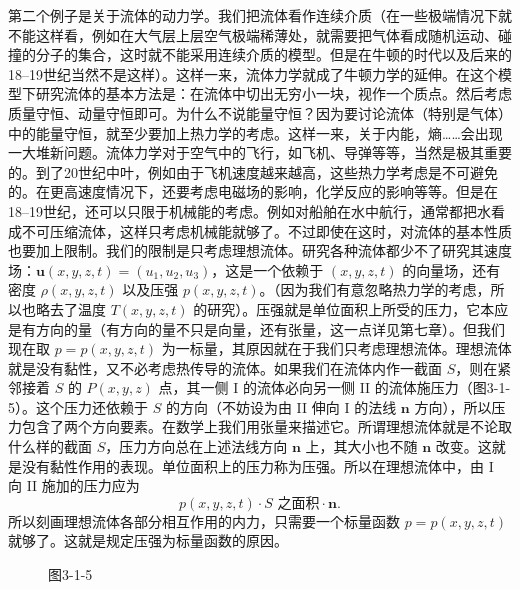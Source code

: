 第二个例子是关于流体的动力学。我们把流体看作连续介质（在一些极端情况下就不能这样看，例如在大气层上层空气极端稀薄处，就需要把气体看成随机运动、碰撞的分子的集合，这时就不能采用连续介质的模型。但是在牛顿的时代以及后来的18--19世纪当然不是这样）。这样一来，流体力学就成了牛顿力学的延伸。在这个模型下研究流体的基本方法是：在流体中切出无穷小一块，视作一个质点。然后考虑质量守恒、动量守恒即可。为什么不说能量守恒？因为要讨论流体（特别是气体）中的能量守恒，就至少要加上热力学的考虑。这样一来，关于内能，熵……会出现一大堆新问题。流体力学对于空气中的飞行，如飞机、导弹等等，当然是极其重要的。到了20世纪中叶，例如由于飞机速度越来越高，这些热力学考虑是不可避免的。在更高速度情况下，还要考虑电磁场的影响，化学反应的影响等等。但是在18--19世纪，还可以只限于机械能的考虑。例如对船舶在水中航行，通常都把水看成不可压缩流体，这样只考虑机械能就够了。不过即使在这时，对流体的基本性质也要加上限制。我们的限制是只考虑理想流体。研究各种流体都少不了研究其速度场：$\boldsymbol u(x,y,z,t)=(u_1,u_2,u_3)$，这是一个依赖于 $(x,y,z,t)$ 的向量场，还有密度 $\rho(x,y,z,t)$ 以及压强 $p(x,y,z,t)$。（因为我们有意忽略热力学的考虑，所以也略去了温度 $T(x,y,z,t)$ 的研究）。压强就是单位面积上所受的压力，它本应是有方向的量（有方向的量不只是向量，还有张量，这一点详见第七章）。但我们现在取 $p=p(x,y,z,t)$ 为一标量，其原因就在于我们只考虑理想流体。理想流体就是没有黏性，又不必考虑热传导的流体。如果我们在流体内作一截面 $S$，则在紧邻接着 $S$ 的 $P(x,y,z)$ 点，其一侧 I 的流体必向另一侧 II 的流体施压力（图3-1-5）。这个压力还依赖于 $S$ 的方向（不妨设为由 II 伸向 I 的法线 $\boldsymbol n$ 方向），所以压力包含了两个方向要素。在数学上我们用张量来描述它。所谓理想流体就是不论取什么样的截面 $S$，压力方向总在上述法线方向 $\boldsymbol n$ 上，其大小也不随 $\boldsymbol n$ 改变。这就是没有黏性作用的表现。单位面积上的压力称为压强。所以在理想流体中，由 I 向 II 施加的压力应为
\[
p(x,y,z,t)\cdot S\text{ 之面积}\cdot\boldsymbol n.
\]
所以刻画理想流体各部分相互作用的内力，只需要一个标量函数 $p=p(x,y,z,t)$ 就够了。这就是规定压强为标量函数的原因。

\begin{figure}[htbp]
\centering
{}
\caption*{图3-1-5}
\end{figure}

